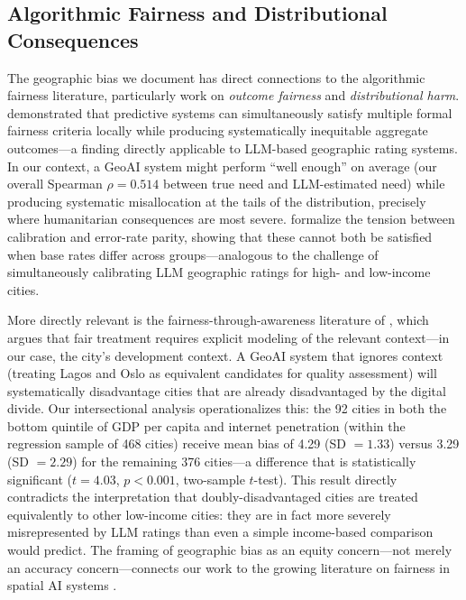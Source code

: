 \documentclass[12pt]{article}
\begin{document}
\subsection{Algorithmic Fairness and Distributional Consequences}

The geographic bias we document has direct connections to the algorithmic fairness literature, particularly work on \emph{outcome fairness} and \emph{distributional harm}. \citet{chouldechova2017fair} demonstrated that predictive systems can simultaneously satisfy multiple formal fairness criteria locally while producing systematically inequitable aggregate outcomes---a finding directly applicable to LLM-based geographic rating systems. In our context, a GeoAI system might perform ``well enough'' on average (our overall Spearman $\rho = 0.514$ between true need and LLM-estimated need) while producing systematic misallocation at the tails of the distribution, precisely where humanitarian consequences are most severe. \citet{kleinberg2017human} formalize the tension between calibration and error-rate parity, showing that these cannot both be satisfied when base rates differ across groups---analogous to the challenge of simultaneously calibrating LLM geographic ratings for high- and low-income cities.

More directly relevant is the fairness-through-awareness literature of \citet{dwork2012fairness}, which argues that fair treatment requires explicit modeling of the relevant context---in our case, the city's development context. A GeoAI system that ignores context (treating Lagos and Oslo as equivalent candidates for quality assessment) will systematically disadvantage cities that are already disadvantaged by the digital divide. Our intersectional analysis operationalizes this: the 92 cities in both the bottom quintile of GDP per capita and internet penetration (within the regression sample of 468 cities) receive mean bias of 4.29 (SD $= 1.33$) versus 3.29 (SD $= 2.29$) for the remaining 376 cities---a difference that is statistically significant ($t = 4.03$, $p < 0.001$, two-sample $t$-test). This result directly contradicts the interpretation that doubly-disadvantaged cities are treated equivalently to other low-income cities: they are in fact more severely misrepresented by LLM ratings than even a simple income-based comparison would predict. The framing of geographic bias as an equity concern---not merely an accuracy concern---connects our work to the growing literature on fairness in spatial AI systems \citep{anselin2020spatial}.
\end{document}
